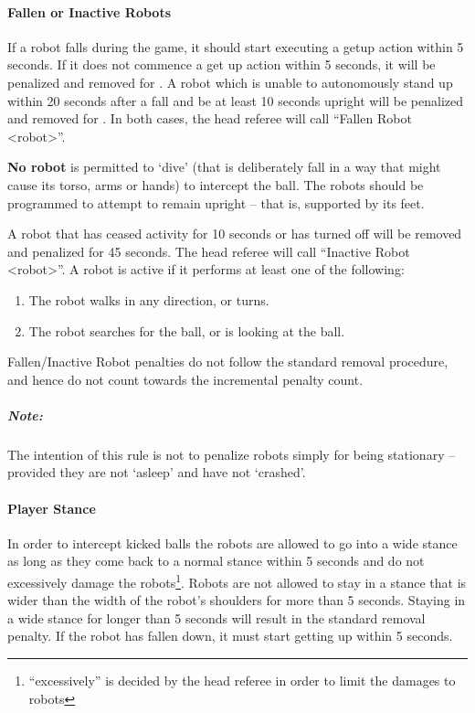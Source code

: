 \paragraph{Fallen or Inactive Robots}
\label{sec:fallenrobots}

If a robot falls during the game, it should start executing a getup action within 5 seconds. If it does not commence a get up action within 5 seconds, it will be penalized and removed for \StandardPenaltyTime.
A robot which is unable to autonomously stand up within 20 seconds after a fall and be at least 10 seconds upright will be penalized and removed for \StandardPenaltyTime. 
In both cases, the head referee will call ``Fallen Robot  \textless robot\textgreater''.

\textbf{No robot} is permitted to `dive' (that is deliberately fall in a way that might cause its torso, arms or hands) to intercept the ball. The robots should be programmed to attempt to remain upright -- that is, supported by its feet.

A robot that has ceased activity for 10 seconds or has turned off will be removed and penalized for 45 seconds.
The head referee will call ``Inactive Robot  \textless robot\textgreater''.
A robot is active if it performs at least one of the following:
\begin{enumerate}
	\item The robot walks in any direction, or turns.
	\item The robot searches for the ball, or is looking at the ball.
\end{enumerate}

Fallen/Inactive Robot penalties do not follow the standard removal procedure, and hence do not count towards the incremental penalty count.

\subparagraph{Note:} The intention of this rule is not to penalize robots simply for being stationary -- provided they are not `asleep' and have not `crashed'.

\paragraph{Player Stance}
\label{sec:player_stance}
In order to intercept kicked balls the robots are allowed to go into a wide stance as long as they come back to a normal stance within 5 seconds and do not excessively damage the robots\footnote{``excessively'' is decided by the head referee in order to limit the damages to robots}. Robots are not allowed to stay in a stance that is wider than the width of the robot's shoulders for more than 5 seconds. Staying in a wide stance for longer than 5 seconds will result in the standard removal penalty. If the robot has fallen down, it must start getting up within 5 seconds. 

